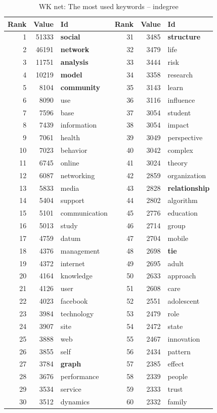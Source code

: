 \documentclass[11pt]{article} %
\begin{document}
\begin{table}
\caption{WK net: \label{keyind} The most used keywords -- indegree}\medskip
\renewcommand{\arraystretch}{0.9}
\begin{center}
\begin{tabular}{r|r|l||r|r|l}
Rank&  	Value&  	Id&  	Rank&  	Value&  	Id\\ \hline
1&  	51333&  	\textbf{social}&  	31&  	3485&  	\textbf{structure}\\
2&  	46191&  	\textbf{network}&  	32&  	3479&  	life\\
3&  	11751&         \textbf {analysis}&  	33&  	3444&  	risk\\
4&  	10219&  	\textbf{model}&  	34&  	3358&  	research\\
5&  	8104&  	\textbf{community}&  	35&  	3143&  	learn\\
6&  	8090&  	use&  	36&  	3116&  	influence\\
7&  	7596&  	base&  	37&  	3054&  	student\\
8&  	7439&  	information&  	38&  	3054&  	impact\\
9&  	7061&  	health&  	39&  	3049&  	perspective\\
10&  	7023&  	behavior&  	40&  	3042&  	complex\\
11&  	6745&  	online&  	41&  	3024&  	theory\\
12&  	6087&  	networking&  	42&  	2859&  	organization\\
13&  	5833&  	media&  	43&  	2828&  	\textbf{relationship}\\
14&  	5404&  	support&  	44&  	2802&  	algorithm\\
15&  	5101&  	communication&  	45&  	2776&  	education\\
16&  	5013&  	study&  	46&  	2714&  	group\\
17&  	4759&  	datum&  	47&  	2704&  	mobile\\
18&  	4376&  	management&  	48&  	2698&  	\textbf{tie}\\
19&  	4372&  	internet&  	49&  	2695&  	adult\\
20&  	4164&  	knowledge&  	50&  	2633&  	approach\\
21&  	4126&  	user&  	51&  	2608&  	care\\
22&  	4023&  	facebook&  	52&  	2551&  	adolescent\\
23&  	3984&  	technology&  	53&  	2479&  	role\\
24&  	3907&  	site&  	54&  	2472&  	state\\
25&  	3888&  	web&  	55&  	2467&  	innovation\\
26&  	3855&  	self&  	56&  	2434&  	pattern\\
27&  	3784&  	\textbf{graph}&  	57&  	2385&  	effect\\
28&  	3676&  	performance&  	58&  	2339&  	people\\
29&  	3534&  	service&  	59&  	2333&  	trust\\
30&  	3512&  	dynamics&  	60&  	2332&  	family\\ \hline
\end{tabular}
\end{center}

\end{table}
\end{document}
